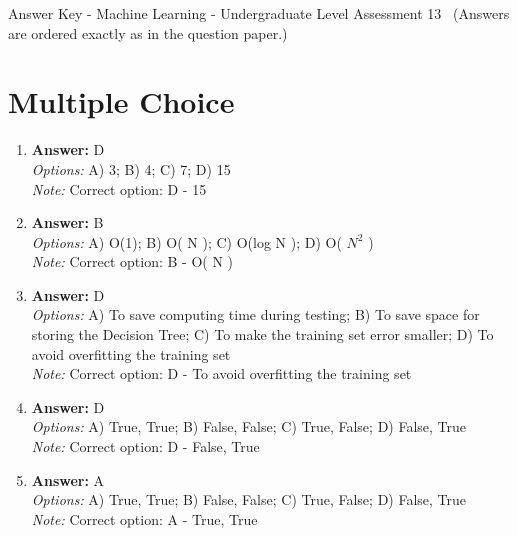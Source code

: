 \documentclass[12pt]{article}
\begin{document}
\begin{center}
Answer Key - Machine Learning - Undergraduate Level Assessment 13 \
\small (Answers are ordered exactly as in the question paper.)
\end{center}

\section*{Multiple Choice}
\begin{enumerate}[label=\arabic*.]
\item \textbf{Answer:} D
\\ \textit{Options:} A) 3; B) 4; C) 7; D) 15
\\ \textit{Note:} Correct option: D - 15
\item \textbf{Answer:} B
\\ \textit{Options:} A) O(1); B) O( N ); C) O(log N ); D) O( $N^2$ )
\\ \textit{Note:} Correct option: B - O( N )
\item \textbf{Answer:} D
\\ \textit{Options:} A) To save computing time during testing; B) To save space for storing the Decision Tree; C) To make the training set error smaller; D) To avoid overfitting the training set
\\ \textit{Note:} Correct option: D - To avoid overfitting the training set
\item \textbf{Answer:} D
\\ \textit{Options:} A) True, True; B) False, False; C) True, False; D) False, True
\\ \textit{Note:} Correct option: D - False, True
\item \textbf{Answer:} A
\\ \textit{Options:} A) True, True; B) False, False; C) True, False; D) False, True
\\ \textit{Note:} Correct option: A - True, True
\end{enumerate}
\end{document}
